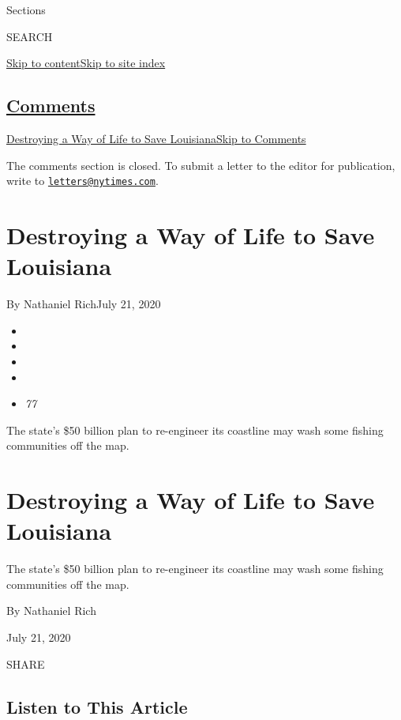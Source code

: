 Sections

SEARCH

\protect\hyperlink{site-content}{Skip to
content}\protect\hyperlink{site-index}{Skip to site index}

\hypertarget{comments}{%
\subsection{\texorpdfstring{\protect\hyperlink{commentsContainer}{Comments}}{Comments}}\label{comments}}

\href{}{Destroying a Way of Life to Save Louisiana}\href{}{Skip to
Comments}

The comments section is closed. To submit a letter to the editor for
publication, write to
\href{mailto:letters@nytimes.com}{\nolinkurl{letters@nytimes.com}}.

\hypertarget{destroying-a-way-of-life-to-save-louisiana}{%
\section{Destroying a Way of Life to Save
Louisiana}\label{destroying-a-way-of-life-to-save-louisiana}}

By Nathaniel RichJuly 21, 2020

\begin{itemize}
\item
\item
\item
\item
\item
  \emph{77}
\end{itemize}

The state's \$50 billion plan to re-engineer its coastline may wash some
fishing communities off the map.

\hypertarget{destroying-a-way-of-life-to-save-louisiana-1}{%
\section{Destroying a Way of Life to Save
Louisiana}\label{destroying-a-way-of-life-to-save-louisiana-1}}

The state's \$50 billion plan to re-engineer its coastline may wash some
fishing communities off the map.

By Nathaniel Rich

July 21, 2020

SHARE

\hypertarget{listen-to-this-article}{%
\subsection{Listen to This Article}\label{listen-to-this-article}}


